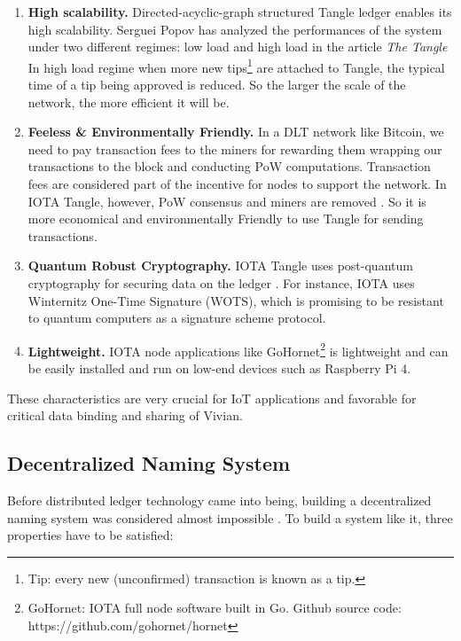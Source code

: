 \begin{enumerate}
    \item \textbf{High scalability.} Directed-acyclic-graph structured Tangle ledger enables its high scalability. Serguei Popov has analyzed the performances of the system under two different regimes: low load and high load in the article \textit{The Tangle} \cite{popov2018tangle} In high load regime when more new tips\footnote{Tip: every new (unconfirmed) transaction is known as a tip.} are attached to Tangle, the typical time of a tip being approved is reduced.
          So the larger the scale of the network, the more efficient it will be.
    \item \textbf{Feeless \& Environmentally Friendly.} In a DLT network like Bitcoin, we need to pay transaction fees to the miners for rewarding them wrapping our transactions to the block and conducting PoW computations. Transaction fees are considered part of the incentive for nodes to support the network. In IOTA Tangle, however, PoW consensus and miners are removed \cite{popov2019iota}. So it is more economical and environmentally Friendly to use Tangle for sending transactions.
    \item \textbf{Quantum Robust Cryptography.} IOTA Tangle uses post-quantum cryptography for securing data on the ledger \cite{tennant2017improving}. For instance, IOTA uses Winternitz One-Time Signature (WOTS), which is promising to be resistant to quantum computers \cite{buchmann2008post} as a signature scheme protocol.
    \item \textbf{Lightweight.} IOTA node applications like GoHornet\footnote{GoHornet: IOTA full node software built in Go. Github source code: https://github.com/gohornet/hornet} is lightweight and can be easily installed and run on low-end devices such as Raspberry Pi 4.
\end{enumerate}

These characteristics are very crucial for IoT applications and favorable for critical data binding and sharing of Vivian.


\subsection{Decentralized Naming System}
Before distributed ledger technology came into being, building a decentralized naming system was considered almost impossible \cite{swartz_2011}. To build a system like it, three properties have to be satisfied:

